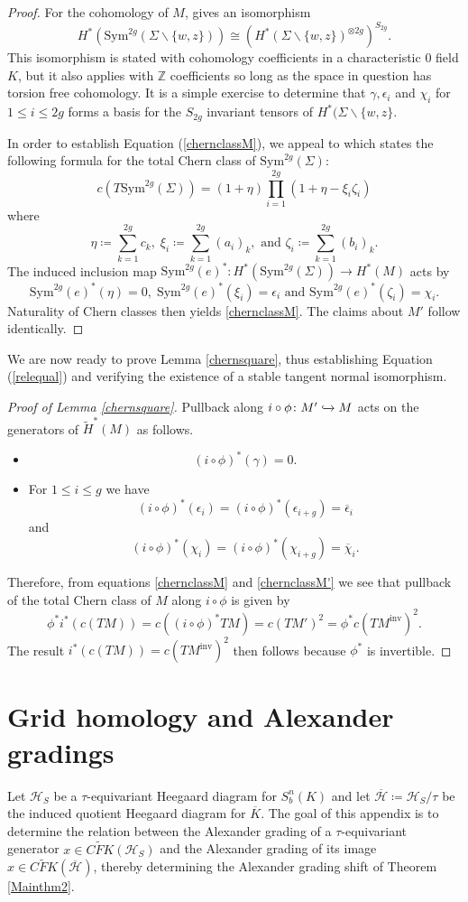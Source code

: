\documentclass[11pt]{amsart}
\theoremstyle{definition}
\theoremstyle{remark}
\def\Z{\mathbb{Z}}
\def\Sym{\mathrm{Sym}}
\newcommand{\M}{M^{\operatorname{inv}}}
\numberwithin{equation}{section}
\begin{document}
\begin{proof}
 For the cohomology of $M$,  \cite[~Equation 1.2]{Mac} gives an isomorphism \[H^*(\Sym^{2g}(\Sigma\backslash \{w,z\}))\cong (H^*(\Sigma\backslash \{w,z\})^{\otimes 2g})^{S_{2g}}.\] This isomorphism is stated with cohomology coefficients in a characteristic $0$ field $K$, but it also applies with $\Z$ coefficients so long as the space in question has torsion free cohomology. It is a simple exercise to determine that $\gamma,\epsilon_i$ and $\chi_i$ for $1\le i\le 2g$ forms a basis for the $S_{2g}$ invariant tensors of $H^*(\Sigma\backslash \{w,z\}$.

In order to establish Equation (\ref{chernclassM}), we appeal to \cite[~(14.5)]{Mac} which states the following formula for the total Chern class of $\Sym^{2g}(\Sigma)$:
\[c(T\text{Sym}^{2g}(\Sigma))=(1+\eta)\prod_{i=1}^{2g}(1+\eta-\xi_i\zeta_{i})
\]
where \[\eta\coloneq \sum_{k=1}^{2g}c_k,\;\xi_i\coloneq \sum_{k=1}^{2g}(a_i)_k,\textrm{ and } \zeta_i\coloneq \sum_{k=1}^{2g}(b_i)_k.\]
 The induced inclusion map $\Sym^{2g}(e)^*\colon H^*(\text{Sym}^{2g}(\Sigma))\to H^*(M)$ acts by \[\Sym^{2g}(e)^*(\eta)=0,\;\Sym^{2g}(e)^*(\xi_i)=\epsilon_i\textrm{ and }\Sym^{2g}(e)^*(\zeta_i)=\chi_i.\]  Naturality of Chern classes then yields \ref{chernclassM}. The claims about $M'$ follow identically.
\end{proof}
We are now ready to prove Lemma \ref{chernsquare}, thus establishing Equation (\ref{relequal}) and verifying the existence of a stable tangent normal isomorphism.
\begin{proof}[Proof of Lemma \ref{chernsquare}]\label{chernsquareproof}Pullback along $i\circ \phi\colon M'\xhookrightarrow{}M$ acts on the generators of $\widetilde{H}^*(M)$ as follows. 
  \begin{itemize}
  \item \[(i\circ \phi)^*(\gamma)=0.\]
  \item For $1\le i\le g$ we have  \[(i\circ \phi)^*(\epsilon_i)=(i\circ \phi)^*(\epsilon_{i+g})=\overline{\epsilon}_i\] and \[(i\circ \phi)^*(\chi_i)=(i\circ \phi)^*(\chi_{i+g})=\overline{\chi}_i.\]
  \end{itemize}
Therefore, from equations \ref{chernclassM} and \ref{chernclassM'} we see that pullback of the total Chern class of $M$ along $i\circ \phi$ is given by \[\phi^*i^*(c(TM))=c((i\circ \phi)^*TM)=c(TM')^2=\phi^*c(T\M)^2.\]The result $i^*(c(TM))=c(T\M)^2$ then follows because $\phi^*$ is invertible.
 \end{proof}
\appendix
\section{Grid homology and Alexander gradings}\label{Appendix}
Let $\mathcal{H}_S$ be a $\tau$-equivariant Heegaard diagram for $S^n_b(K)$ and let $\overline{\mathcal{H}}\coloneq \mathcal{H}_S/\tau$ be the induced quotient Heegaard diagram for $\overline{K}$. The goal of this appendix is to determine the relation between the Alexander grading of a $\tau$-equivariant generator $x\in\widetilde{CFK}(\mathcal{H}_S)$ and the Alexander grading of its image $x\in \widetilde{CFK}(\overline{\mathcal{H}})$, thereby determining the Alexander grading shift of Theorem \ref{Mainthm2}. 
\end{document}
